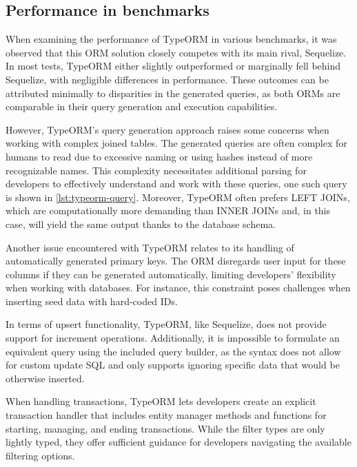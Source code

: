 \subsection*{Performance in benchmarks}

When examining the performance of TypeORM in various benchmarks, it was observed
that this ORM solution closely competes with its main rival, Sequelize. In most
tests, TypeORM either slightly outperformed or marginally fell behind Sequelize,
with negligible differences in performance. These outcomes can be attributed
minimally to disparities in the generated queries, as both ORMs are comparable
in their query generation and execution capabilities.

However, TypeORM's query generation approach raises some concerns when working
with complex joined tables. The generated queries are often complex for humans
to read due to excessive naming or using hashes instead of more recognizable
names. This complexity necessitates additional parsing for developers to
effectively understand and work with these queries, one such query is shown in
\autoref{lst:typeorm-query}. Moreover, TypeORM often prefers LEFT JOINs, which
are computationally more demanding than INNER JOINs and, in this case, will
yield the same output thanks to the database schema.

Another issue encountered with TypeORM relates to its handling of automatically
generated primary keys. The ORM disregards user input for these columns if they
can be generated automatically, limiting developers' flexibility when working
with databases. For instance, this constraint poses challenges when inserting
seed data with hard-coded IDs.

In terms of upsert functionality, TypeORM, like Sequelize, does not provide
support for increment operations. Additionally, it is impossible to formulate an
equivalent query using the included query builder, as the syntax does not allow
for custom update SQL and only supports ignoring specific data that would be
otherwise inserted.

When handling transactions, TypeORM lets developers create an explicit
transaction handler that includes entity manager methods and functions for
starting, managing, and ending transactions. While the filter types are only
lightly typed, they offer sufficient guidance for developers navigating the
available filtering options.

